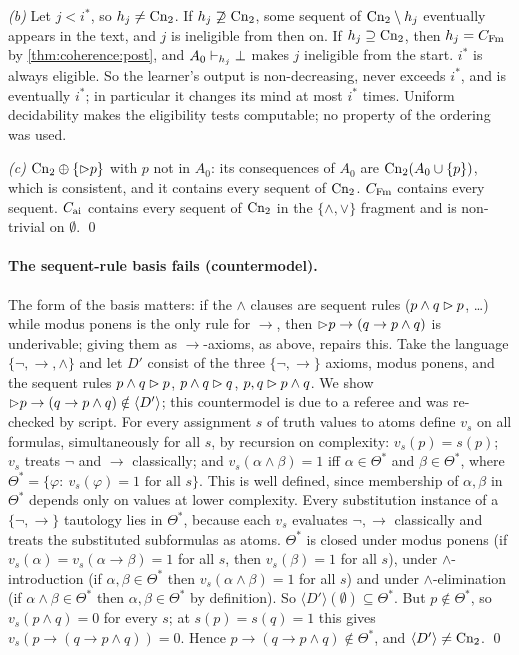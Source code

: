 \emph{(b)} Let $j<i^*$, so $h_j\neq\mathrm{Cn}_2$. If $h_j\not\supseteq\mathrm{Cn}_2$, some sequent of $\mathrm{Cn}_2\setminus h_j$ eventually appears in the text, and $j$ is ineligible from then on. If $h_j\supseteq\mathrm{Cn}_2$, then $h_j=C_{\mathrm{Fm}}$ by \cref{thm:coherence:post}, and $A_0\vdash_{h_j}\bot$ makes $j$ ineligible from the start. $i^*$ is always eligible. So the learner's output is non-decreasing, never exceeds $i^*$, and is eventually $i^*$; in particular it changes its mind at most $i^*$ times. Uniform decidability makes the eligibility tests computable; no property of the ordering was used.

\emph{(c)} $\mathrm{Cn}_2\oplus\{\rhd p\}$ with $p$ not in $A_0$: its consequences of $A_0$ are $\mathrm{Cn}_2(A_0\cup\{p\})$, which is consistent, and it contains every sequent of $\mathrm{Cn}_2$. $C_{\mathrm{Fm}}$ contains every sequent. $C_{\mathrm{ai}}$ contains every sequent of $\mathrm{Cn}_2$ in the $\{\wedge,\vee\}$ fragment and is non-trivial on $\emptyset$. \qed

\paragraph{The sequent-rule basis fails (countermodel).} The form of the basis matters: if the $\wedge$ clauses are sequent rules ($p\wedge q\rhd p$, \dots) while modus ponens is the only rule for $\to$, then $\rhd p\to(q\to p\wedge q)$ is underivable; giving them as $\to$-axioms, as above, repairs this. Take the language $\{\neg,\to,\wedge\}$ and let $D'$ consist of the three $\{\neg,\to\}$ axioms, modus ponens, and the sequent rules $p\wedge q\rhd p$, $p\wedge q\rhd q$, $p,q\rhd p\wedge q$. We show $\rhd p\to(q\to p\wedge q)\notin\langle D'\rangle$; this countermodel is due to a referee and was re-checked by script. For every assignment $s$ of truth values to atoms define $v_s$ on all formulas, simultaneously for all $s$, by recursion on complexity: $v_s(p)=s(p)$; $v_s$ treats $\neg$ and $\to$ classically; and $v_s(\alpha\wedge\beta)=1$ iff $\alpha\in\Theta^*$ and $\beta\in\Theta^*$, where $\Theta^*=\{\varphi:\ v_s(\varphi)=1\text{ for all }s\}$. This is well defined, since membership of $\alpha,\beta$ in $\Theta^*$ depends only on values at lower complexity. Every substitution instance of a $\{\neg,\to\}$ tautology lies in $\Theta^*$, because each $v_s$ evaluates $\neg,\to$ classically and treats the substituted subformulas as atoms. $\Theta^*$ is closed under modus ponens (if $v_s(\alpha)=v_s(\alpha\to\beta)=1$ for all $s$, then $v_s(\beta)=1$ for all $s$), under $\wedge$-introduction (if $\alpha,\beta\in\Theta^*$ then $v_s(\alpha\wedge\beta)=1$ for all $s$) and under $\wedge$-elimination (if $\alpha\wedge\beta\in\Theta^*$ then $\alpha,\beta\in\Theta^*$ by definition). So $\langle D'\rangle(\emptyset)\subseteq\Theta^*$. But $p\notin\Theta^*$, so $v_s(p\wedge q)=0$ for every $s$; at $s(p)=s(q)=1$ this gives $v_s(p\to(q\to p\wedge q))=0$. Hence $p\to(q\to p\wedge q)\notin\Theta^*$, and $\langle D'\rangle\neq\mathrm{Cn}_2$. \qed

